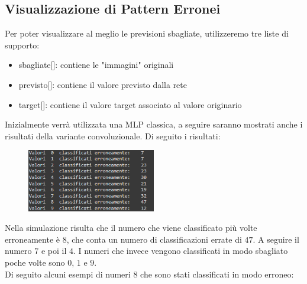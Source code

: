 \documentclass[12pt, a4paper]{article}
\begin{document}
\subsection{Visualizzazione di Pattern Erronei}
Per poter visualizzare al meglio le previsioni sbagliate, utilizzeremo tre liste di supporto:
\begin{itemize}
    \item sbagliate[]: contiene le "immagini" originali
    \item previsto[]: contiene il valore previsto dalla rete
    \item target[]: contiene il valore target associato al valore originario
\end{itemize}

Inizialmente verrà utilizzata una MLP classica, a seguire saranno mostrati anche i risultati della variante convoluzionale.
Di seguito i risultati:
\begin{figure}[H]
    \centering
    \includegraphics[width=0.50\textwidth]{ErrateClassica.png}
\end{figure}

Nella simulazione risulta che il numero che viene classificato più volte erroneamente è \(8\), che conta un numero di classificazioni errate di \(47\). A seguire il numero \(7\) e poi il \(4\). I numeri che invece vengono classificati in modo sbagliato poche volte sono \(0\), \(1\) e \(9\).\\
Di seguito alcuni esempi di numeri \(8\) che sono stati classificati in modo erroneo:
\end{document}
